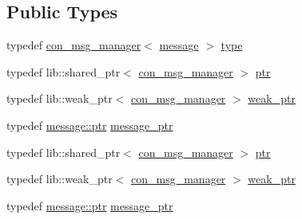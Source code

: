 \subsection*{Public Types}
\begin{DoxyCompactItemize}
\item 
typedef \hyperlink{classwebsocketpp_1_1message__buffer_1_1alloc_1_1con__msg__manager}{con\+\_\+msg\+\_\+manager}$<$ \hyperlink{classwebsocketpp_1_1message__buffer_1_1message}{message} $>$ \hyperlink{classwebsocketpp_1_1message__buffer_1_1alloc_1_1con__msg__manager_a840b8d39b51cf58fb454ecf45927cb43}{type}
\item 
typedef lib\+::shared\+\_\+ptr$<$ \hyperlink{classwebsocketpp_1_1message__buffer_1_1alloc_1_1con__msg__manager}{con\+\_\+msg\+\_\+manager} $>$ \hyperlink{classwebsocketpp_1_1message__buffer_1_1alloc_1_1con__msg__manager_ab4a21eb77cea439747f0b988e643e940}{ptr}
\item 
typedef lib\+::weak\+\_\+ptr$<$ \hyperlink{classwebsocketpp_1_1message__buffer_1_1alloc_1_1con__msg__manager}{con\+\_\+msg\+\_\+manager} $>$ \hyperlink{classwebsocketpp_1_1message__buffer_1_1alloc_1_1con__msg__manager_add831fd5b6298dbcfdc5372ebc857553}{weak\+\_\+ptr}
\item 
typedef \hyperlink{classwebsocketpp_1_1message__buffer_1_1message_adb52b5feb820ec7bc6140cc8be9edd57}{message\+::ptr} \hyperlink{classwebsocketpp_1_1message__buffer_1_1alloc_1_1con__msg__manager_a2b7d97fc21ff99e307ec20fe0369f294}{message\+\_\+ptr}
\item 
typedef lib\+::shared\+\_\+ptr$<$ \hyperlink{classwebsocketpp_1_1message__buffer_1_1alloc_1_1con__msg__manager}{con\+\_\+msg\+\_\+manager} $>$ \hyperlink{classwebsocketpp_1_1message__buffer_1_1alloc_1_1con__msg__manager_ab4a21eb77cea439747f0b988e643e940}{ptr}
\item 
typedef lib\+::weak\+\_\+ptr$<$ \hyperlink{classwebsocketpp_1_1message__buffer_1_1alloc_1_1con__msg__manager}{con\+\_\+msg\+\_\+manager} $>$ \hyperlink{classwebsocketpp_1_1message__buffer_1_1alloc_1_1con__msg__manager_add831fd5b6298dbcfdc5372ebc857553}{weak\+\_\+ptr}
\item 
typedef \hyperlink{classwebsocketpp_1_1message__buffer_1_1message_adb52b5feb820ec7bc6140cc8be9edd57}{message\+::ptr} \hyperlink{classwebsocketpp_1_1message__buffer_1_1alloc_1_1con__msg__manager_a2b7d97fc21ff99e307ec20fe0369f294}{message\+\_\+ptr}
\end{DoxyCompactItemize}
